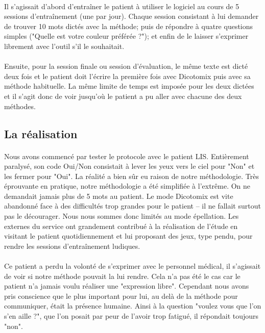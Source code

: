 \documentclass[11pt,a4paper]{article}
\theoremstyle{plain}
\theoremstyle{definition}
\begin{document}
\paragraph{} Il s'agissait d'abord d'entraîner le patient à utiliser le logiciel au cours de 5 sessions d'entraînement (une par jour). Chaque session consistant à lui demander de trouver 10 mots dictés avec la méthode; puis de répondre à quatre questions simples ("Quelle est votre couleur préférée ?"); et 
enfin de le laisser s'exprimer librement avec l'outil s'il le souhaitait.
\paragraph{} Ensuite, pour la session finale ou session d'évaluation, le même texte est dicté deux fois et le patient doit l'écrire la première fois avec Dicotomix puis avec sa méthode habituelle. La même limite de temps est imposée pour les deux dictées et il s'agit donc de voir jusqu'où le patient a pu aller avec chacune des 
deux méthodes.


\subsection{La réalisation}

\paragraph{} Nous avons commencé par tester le protocole avec le patient LIS. Entièrement paralysé, son code Oui/Non consistait à lever les yeux vers le ciel pour "Non" et les fermer pour "Oui". La réalité a bien sûr eu raison de notre méthodologie. Très éprouvante en pratique, notre méthodologie a été simplifiée à l'extrême. On ne demandait jamais plus de 5 mots 
au patient. Le mode Dicotomix est vite abandonné face à des difficultés trop grandes pour le patient -- il ne fallait surtout pas le décourager. Nous nous sommes donc limités
au mode épellation. Les externes du service ont grandement contribué à la réalisation de l'étude en visitant le patient quotidiennement et lui proposant des jeux, type pendu, 
pour rendre les sessions d'entraînement ludiques. 

\paragraph{} Ce patient a perdu la volonté de s'exprimer avec le personnel médical, il s'agissait de voir si notre méthode pouvait la  lui rendre. Cela n'a pas été le cas car le patient n'a jamais voulu réaliser une "expression libre". Cependant nous avons pris conscience que le plus important pour lui, au delà de la 
 méthode pour communiquer, était la présence humaine. Ainsi à la question "voulez vous que l'on s'en aille ?", que l'on posait par peur de l'avoir trop fatigué, il répondait toujours "non".
\end{document}
